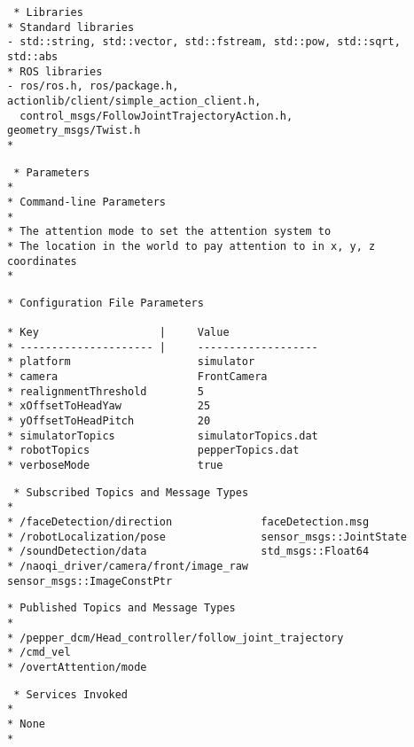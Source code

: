 \documentclass{CSSRforAfrica}
\newcommand{\checkboxChecked}{\fbox{\ding{51}}} %
\begin{document}
\begin{description}
\item[\checkboxChecked] 
 {\small 
\begin{verbatim}
 * Libraries
* Standard libraries
- std::string, std::vector, std::fstream, std::pow, std::sqrt, std::abs
* ROS libraries
- ros/ros.h, ros/package.h, actionlib/client/simple_action_client.h, 
  control_msgs/FollowJointTrajectoryAction.h, geometry_msgs/Twist.h
*
\end{verbatim}}

\item[\checkboxChecked] 
 {\small 
\begin{verbatim}
 * Parameters
*
* Command-line Parameters
*
* The attention mode to set the attention system to
* The location in the world to pay attention to in x, y, z coordinates
*
\end{verbatim}}


\item[\checkboxChecked] 
 {\small 
\begin{verbatim}
* Configuration File Parameters

* Key                   |     Value 
* --------------------- |     -------------------
* platform                    simulator
* camera                      FrontCamera
* realignmentThreshold        5
* xOffsetToHeadYaw            25
* yOffsetToHeadPitch          20
* simulatorTopics             simulatorTopics.dat
* robotTopics                 pepperTopics.dat
* verboseMode                 true
\end{verbatim}}

\item[\checkboxChecked] 
 {\small 
\begin{verbatim}
 * Subscribed Topics and Message Types
*
* /faceDetection/direction              faceDetection.msg     
* /robotLocalization/pose               sensor_msgs::JointState
* /soundDetection/data                  std_msgs::Float64    
* /naoqi_driver/camera/front/image_raw  sensor_msgs::ImageConstPtr       
\end{verbatim}}


\item[\checkboxChecked] 
 {\small 
\begin{verbatim}                    
* Published Topics and Message Types
* 
* /pepper_dcm/Head_controller/follow_joint_trajectory 
* /cmd_vel                                                 
* /overtAttention/mode                                    
\end{verbatim}}

\item[\checkboxChecked] 
 {\small 
\begin{verbatim}                    
 * Services Invoked
* 
* None
*
\end{verbatim}}


\end{description}
\end{document}
